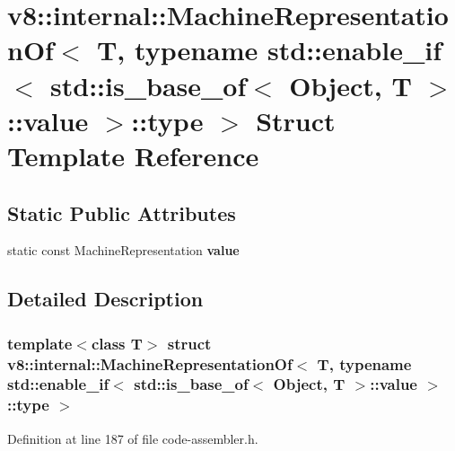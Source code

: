 \hypertarget{structv8_1_1internal_1_1MachineRepresentationOf_3_01T_00_01typename_01std_1_1enable__if_3_01std_5edb38e8202bba0bdc84b6abce010321}{}\section{v8\+:\+:internal\+:\+:Machine\+Representation\+Of$<$ T, typename std\+:\+:enable\+\_\+if$<$ std\+:\+:is\+\_\+base\+\_\+of$<$ Object, T $>$\+:\+:value $>$\+:\+:type $>$ Struct Template Reference}
\label{structv8_1_1internal_1_1MachineRepresentationOf_3_01T_00_01typename_01std_1_1enable__if_3_01std_5edb38e8202bba0bdc84b6abce010321}
\subsection*{Static Public Attributes}
\begin{DoxyCompactItemize}
\item 
static const Machine\+Representation {\bfseries value}
\end{DoxyCompactItemize}


\subsection{Detailed Description}
\subsubsection*{template$<$class T$>$\newline
struct v8\+::internal\+::\+Machine\+Representation\+Of$<$ T, typename std\+::enable\+\_\+if$<$ std\+::is\+\_\+base\+\_\+of$<$ Object, T $>$\+::value $>$\+::type $>$}



Definition at line 187 of file code-\/assembler.\+h.



